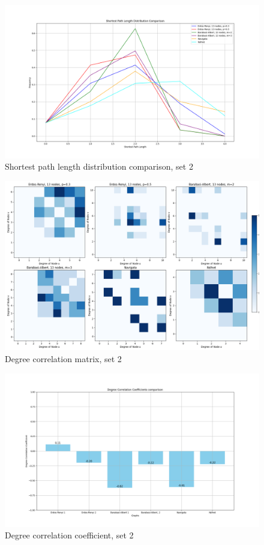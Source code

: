 \begin{figure}
    \centering
    \includegraphics[width=0.9\linewidth]{images/FINAL-TOPO-COMP/line-13.png}
    \caption{Shortest path length distribution comparison, set 2}
    \label{fig:enter-label}
\end{figure}

\begin{figure}
    \centering
    \includegraphics[width=0.9\linewidth]{images/FINAL-TOPO-COMP/Degree-correlation-matrices/13-matrix.png}
    \caption{Degree correlation matrix, set 2}
    \label{fig:enter-label}
\end{figure}

\begin{figure}
    \centering
    \includegraphics[width=0.9\linewidth]{images/FINAL-TOPO-COMP/Degree-correlation-coeff/deg-coeff-13.png}
    \caption{Degree correlation coefficient, set 2}
    \label{fig:enter-label}
\end{figure}


